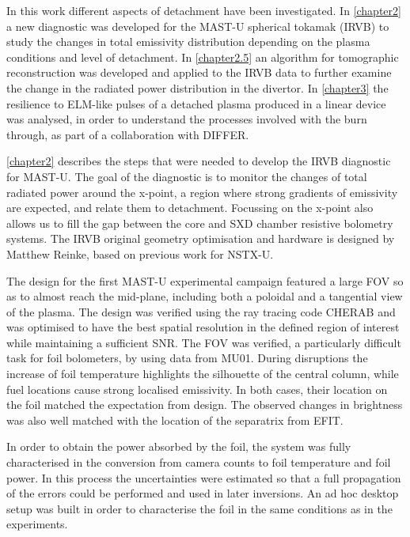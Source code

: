 

In this work different aspects of detachment have been investigated. In \autoref{chapter2} a new diagnostic was developed for the MAST-U spherical tokamak (IRVB) to study the changes in total emissivity distribution depending on the plasma conditions and level of detachment. In \autoref{chapter2.5} an algorithm for tomographic reconstruction was developed and applied to the IRVB data to further examine the change in the radiated power distribution in the divertor. In \autoref{chapter3} the resilience to ELM-like pulses of a detached plasma produced in a linear device was analysed, in order to understand the processes involved with the burn through, as part of a collaboration with DIFFER.

\autoref{chapter2} describes the steps that were needed to develop the IRVB diagnostic for MAST-U. The goal of the diagnostic is to monitor the changes of total radiated power around the x-point, a region where strong gradients of emissivity are expected, and relate them to detachment. Focussing on the x-point also allows us to fill the gap between the core and SXD chamber resistive bolometry systems. The IRVB original geometry optimisation and hardware is designed by Matthew Reinke, based on previous work for NSTX-U. \cite{VanEden2016}

The design for the first MAST-U experimental campaign featured a large FOV so as to almost reach the mid-plane, including both a poloidal and a tangential view of the plasma. The design was verified using the ray tracing code CHERAB and was optimised to have the best spatial resolution in the defined region of interest while maintaining a sufficient SNR. The FOV was verified, a particularly difficult task for foil bolometers, by using data from MU01. During disruptions the increase of foil temperature highlights the silhouette of the central column, while fuel locations cause strong localised emissivity. In both cases, their location on the foil matched the expectation from design. The observed changes in brightness was also well matched with the location of the separatrix from EFIT.

In order to obtain the power absorbed by the foil, the system was fully characterised in the conversion from camera counts to foil temperature and foil power. In this process the uncertainties were estimated so that a full propagation of the errors could be performed and used in later inversions. An ad hoc desktop setup was built in order to characterise the foil in the same conditions as in the experiments.

